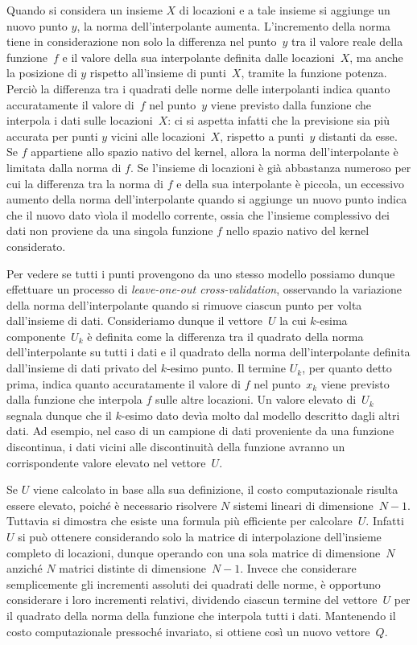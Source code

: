 Quando si considera un insieme $X$ di locazioni e a tale insieme si aggiunge un nuovo punto $y$, la norma dell'interpolante aumenta.  L'incremento della norma tiene in considerazione non solo la differenza nel punto~$y$ tra il valore reale della funzione~$f$ e il valore della sua interpolante definita dalle locazioni~$X$, ma anche la posizione di $y$ rispetto all'insieme di punti~$X$, tramite la funzione potenza.  Perciò la differenza tra i quadrati delle norme delle interpolanti indica quanto accuratamente il valore di~$f$ nel punto~$y$ viene previsto dalla funzione che interpola i dati sulle locazioni~$X$: ci si aspetta infatti che la previsione sia più accurata per punti $y$ vicini alle locazioni~$X$, rispetto a punti~$y$ distanti da esse.
Se $f$ appartiene allo spazio nativo del kernel, allora la  norma  dell’interpolante è limitata dalla norma di $f$.  Se l’insieme di locazioni è già abbastanza numeroso per cui la differenza tra la norma di $f$ e della sua interpolante è piccola,  un eccessivo aumento della norma dell’interpolante quando si aggiunge un nuovo punto indica che il nuovo dato vìola il modello corrente, ossia che l’insieme complessivo dei dati non proviene da una singola funzione $f$ nello spazio nativo del kernel considerato.


Per vedere se tutti i punti provengono da uno stesso modello possiamo dunque effettuare un processo di {\em leave-one-out cross-validation}, osservando la variazione della norma dell’interpolante quando si rimuove ciascun punto per volta dall’insieme di dati.  Consideriamo dunque il vettore~$U$ la cui $k$-esima componente~$U_k$ è definita come la differenza tra il quadrato della norma dell’interpolante su tutti i dati e il quadrato della norma dell’interpolante definita dall’insieme di dati privato del $k$-esimo punto.  Il termine $U_k$, per quanto detto prima, indica quanto accuratamente il valore di $f$ nel punto~$x_k$ viene previsto dalla funzione che interpola $f$ sulle altre locazioni.  Un valore elevato di~$U_k$ segnala dunque che il $k$-esimo dato devìa molto dal modello descritto dagli altri dati.  Ad esempio, nel caso di un campione di dati proveniente da una funzione discontinua, i dati vicini alle discontinuità della funzione avranno un corrispondente valore elevato nel vettore~$U$. 


Se $U$ viene calcolato in base alla sua definizione, il costo computazionale risulta essere elevato, poiché è necessario risolvere $N$ sistemi lineari di dimensione~$N{-}1$.
Tuttavia si dimostra che esiste una formula più efficiente per calcolare~$U$.  Infatti $U$ si può ottenere considerando solo la matrice di interpolazione dell’insieme completo di locazioni, dunque operando con una sola matrice di dimensione~$N$ anziché $N$ matrici distinte di dimensione~$N{-}1$. 
Invece che considerare semplicemente gli incrementi assoluti dei quadrati delle norme, è opportuno considerare i loro incrementi relativi, dividendo ciascun termine del vettore~$U$ per il quadrato della norma della funzione che interpola tutti i dati.  Mantenendo il costo computazionale pressoché invariato, si ottiene così un nuovo vettore~$Q$.


